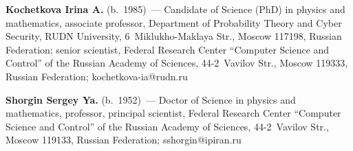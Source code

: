 \vspace*{3pt}

\noindent
\textbf{Kochetkova Irina A.} (b.\ 1985)~--- Candidate of Science (PhD) in physics 
and mathematics, associate professor, Department of Probability Theory and Cyber 
Security, RUDN University, 6~Miklukho-Maklaya Str., Moscow 117198, Russian 
Federation; senior scientist, Federal Research Center ``Computer Science and 
Control'' of the Russian Academy of Sciences, 44-2~Vavilov Str., Moscow 119333, 
Russian Federation; \mbox{kochetkova-ia@rudn.ru}

\vspace*{3pt}

\noindent
\textbf{Shorgin Sergey Ya.} (b.\ 1952)~--- Doctor of Science in physics and 
mathematics, professor, principal scientist, Federal Research Center ``Computer Science and Control'' of the Russian Academy of 
Sciences, 44-2~Vavilov Str., Moscow 119133, Russian Federation; 
\mbox{sshorgin@ipiran.ru}





\label{end\stat}

\renewcommand{\bibname}{\protect\rm Литература} 
